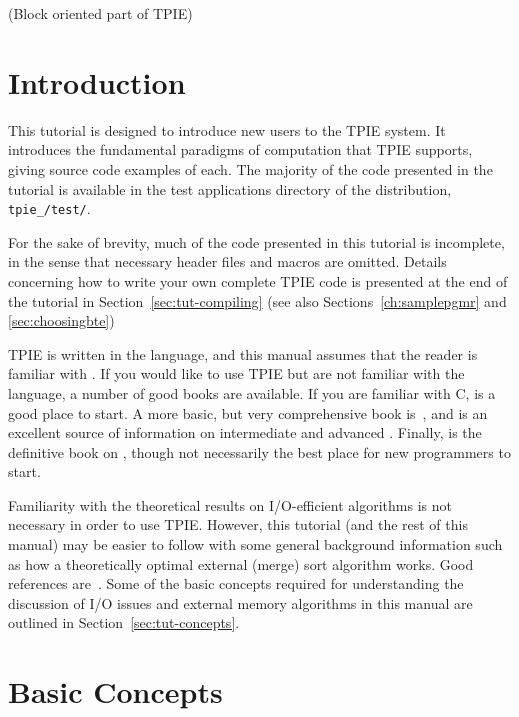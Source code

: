 \tobewritten(Block oriented part of TPIE)

\section{Introduction}

This tutorial is designed to introduce new users to the TPIE system.
It introduces the fundamental paradigms of computation that TPIE
supports, giving source code examples of each.  The majority of the
code presented in the tutorial is available in the test
applications directory of the distribution,
\texttt{tpie\_\version/test/}.

For the sake of brevity, much of the code presented in this tutorial
is incomplete, in the sense that necessary header files  and macros are omitted. Details concerning how
to write your own complete TPIE code is presented at the end of the
tutorial in Section~\ref{sec:tut-compiling} (see also
Sections~\ref{ch:samplepgmr} and \ref{sec:choosingbte})

TPIE is written in the \CPP{} language, and this manual assumes that
the reader is familiar with \CPP{}.  If you would like to use TPIE but
are not familiar with the \CPP{} language, a number of good
books are available. If you are familiar with
C, \cite{pohl:c++} is a good place to start. A more basic,
but very comprehensive book is~\cite{deitel:c++}, and
\cite{meyers:effective} is an excellent source of information on
intermediate and advanced \CPP{}.  Finally, \cite{ellis:arm} is the
definitive book on \CPP{}, though not necessarily the best place for
new programmers to start.

Familiarity with the theoretical results on I/O-efficient algorithms
is not necessary in order to use TPIE. However, this tutorial (and the
rest of this manual) may be easier to follow with some general
background information such as how a theoretically optimal external
(merge) sort algorithm works. Good references
are~\cite{vitter:iosurvey, arge:handbook}. Some of the basic concepts
required for understanding the discussion of I/O issues and external
memory algorithms in this manual are outlined in
Section~\ref{sec:tut-concepts}.

\section{Basic Concepts}
   
